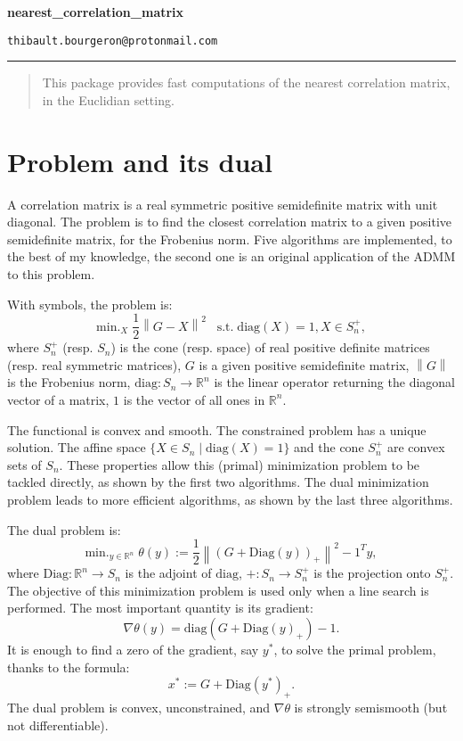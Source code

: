 \documentclass{article}
\newcommand{\norm}[1]{\left\lVert#1\right\rVert}
\newcommand{\R}{\mathbb{R}}
\begin{document}
\begin{center}
{\LARGE \textbf{nearest\_correlation\_matrix}}
\end{center}

\setlength\parindent{0pt}

\begin{center}
\texttt{thibault.bourgeron@protonmail.com}
\end{center}

\noindent\rule{\textwidth}{0.1pt}


\begin{abstract}
This package provides fast computations of the nearest correlation matrix, in the Euclidian setting.
\end{abstract}

\section{Problem and its dual}

A correlation matrix is a real symmetric positive semidefinite matrix with unit diagonal.
The problem is to find the closest correlation matrix to a given positive semidefinite matrix, for the Frobenius norm. Five algorithms are implemented, to the best of my knowledge, the second one is an original application of the ADMM to this problem.

\medskip

With symbols, the problem is:
\[ \textrm{min.}_X \; \frac12 \norm{G - X}^2 \;\;\; \text{s.t.} \; \mathrm{diag}(X) = 1, X \in S_n^+, \]
where $S_n^+$ (resp. $S_n$) is the cone (resp. space) of real positive definite matrices (resp. real symmetric matrices), $G$ is a given positive semidefinite matrix, $\norm{G}$ is the Frobenius norm, $\mathrm{diag}: S_n \to \R^n$ is the linear operator returning the diagonal vector of a matrix, $1$ is the vector of all ones in $\R^n$.

\medskip

The functional is convex and smooth. The constrained problem has a unique solution. The affine space $\{X\in S_n \mid \mathrm{diag}(X) = 1\}$ and the cone $S_n^+$ are convex sets of $S_n$. These properties allow this (primal) minimization problem to be tackled directly, as shown by the first two algorithms. The dual minimization problem leads to more efficient algorithms, as shown by the last three algorithms.

\bigskip

The dual problem is:
\[\textrm{min.}_{y\in\R^n} \; \theta(y) := \frac12 \norm{(G + \mathrm{Diag}(y))_+}^2 - 1^T y, \]
where $\mathrm{Diag}: \R^n \to S_n$ is the adjoint of $\mathrm{diag}$, $+: S_n \to S_n^+$ is the projection onto $S_n^+$.
The objective of this minimization problem is used only when a line search is performed.
The most important quantity is its gradient:
\[
\nabla \theta(y) = \mathrm{diag}(G + \mathrm{Diag}(y)_+) - 1.
\]
It is enough to find a zero of the gradient, say $y^*$, to solve the primal problem, thanks to the formula:
\[ x^* := G + \mathrm{Diag}(y^*)_+. \]
The dual problem is convex, unconstrained, and $\nabla \theta$ is strongly semismooth (but not differentiable).
\end{document}
